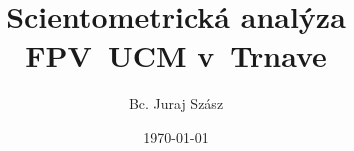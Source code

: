 \documentclass{beamer}
\author{Bc. Juraj Szász}
\title{Scientometrická analýza FPV~UCM v~Trnave}
\date{\today}
\begin{document}

\frame{\maketitle}

\frame{\tableofcontents}


%






\end{document}
